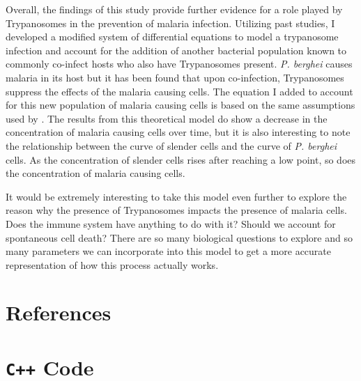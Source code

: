 \documentclass[11pt]{article}
\begin{document}
	Overall, the findings of this study provide further evidence for a role played by Trypanosomes in the prevention of malaria infection. Utilizing past studies, I developed a modified system of differential equations to model a trypanosome infection and account for the addition of another bacterial population known to commonly co-infect hosts who also have Trypanosomes present. \textit{P. berghei} causes malaria in its host but it has been found that upon co-infection, Trypanosomes suppress the effects of the malaria causing cells. The equation I added to account for this new population of malaria causing cells is based on the same assumptions used by \citet{tyler2001limitation}. The results from this theoretical model do show a decrease in the concentration of malaria causing cells over time, but it is also interesting to note the relationship between the curve of slender cells and the curve of \textit{P. berghei} cells. As the concentration of slender cells rises after reaching a low point, so does the concentration of malaria causing cells.
	
	It would be extremely interesting  to take this model even further to explore the reason why the presence of Trypanosomes impacts the presence of malaria cells. Does the immune system have anything to do with it? Should we account for spontaneous cell death? There are so many biological questions to explore and so many parameters we can incorporate into this model to get a more accurate representation of how this process actually works.
	
	\newpage
	
	\section{References}
	\printbibliography[
	heading=none
	]
	\newpage
	
	\section{\texttt{C++} Code}
	
	
	
	
	
	
	
\end{document}
